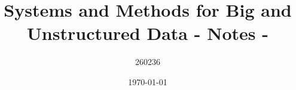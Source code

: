 \author{260236}
\title{Systems and Methods for Big and Unstructured Data - Notes - \version}
\date{\printdayoff\today}
\maketitle
